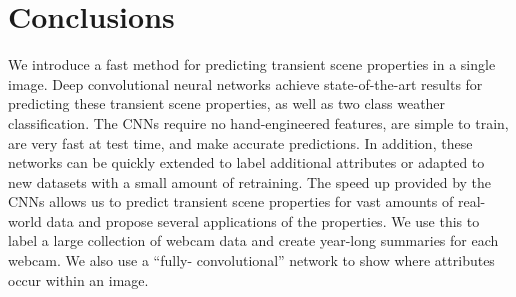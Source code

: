 \documentclass[10pt,twocolumn,letterpaper]{article}
\begin{document}
\section{Conclusions}
We introduce a fast method for predicting transient scene properties in a
single image.  Deep convolutional neural networks achieve state-of-the-art
results for predicting these transient scene properties, as well as two class
weather classification.  The CNNs require no hand-engineered features, are
simple to train, are very fast at test time, and make accurate predictions. In
addition, these networks can be quickly extended to label additional attributes
or adapted to new datasets with a small amount of retraining.  The speed up
provided by the CNNs allows us to predict transient scene properties for vast
amounts of real-world data and propose several applications of the properties.
We use this to label a large collection of webcam data and create year-long
summaries for each webcam.  We also use a ``fully- convolutional'' network to
show where attributes occur within an image.

%

{\small


}
\end{document}
